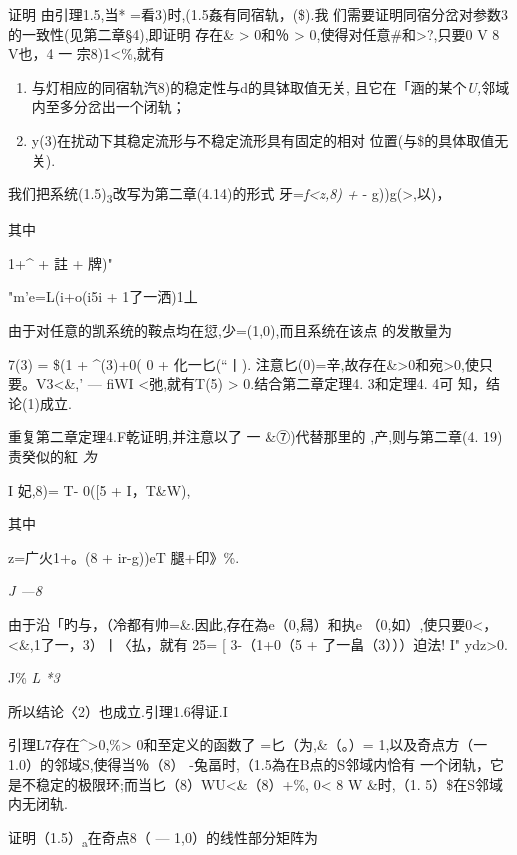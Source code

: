 \documentclass{article}
\begin{document}
证明 由引理1.5,当* =看3)时,(1.5姦有同宿轨，(\$).我
们需要证明同宿分岔对参数3的一致性(见第二章§4),即证明 存在\&
\textgreater{} 0和％ \textgreater{}
0,使得对任意\#和\textgreater{}?,只要0 V 8 V也，\textbar{}4 一
宗8)1\textless{}\%,就有

\begin{enumerate}
\def\labelenumi{(\arabic{enumi})}
\item
  与灯相应的同宿轨汽8)的稳定性与d的具钵取值无关,
  且它在「涵的某个\emph{U,}邻域内至多分岔出一个闭轨；
\item
  y(3)在扰动下其稳定流形与不稳定流形具有固定的相对
  位置(与\$的具体取值无关).
\end{enumerate}

我们把系统(1.5)\textsubscript{3}改写为第二章(4.14)的形式
牙=\emph{f\textless{}z,8) +} - g))g(\textgreater{},以)，

其中

1+\^{} + 註 + 牌)"

"m'e=L(i+o(i5i + 1了一洒)1丄

由于对任意的凯系统的鞍点均在愆,少=(1,0),而且系统在该点 的发散量为

7(3) = \$(1 + \^{}(3)+0( 0\textbar{} + 化一匕(``丨).
注意匕(0)=辛,故存在\&\textgreater{}0和宛\textgreater{}0,使只要。V3\textless{}\&,\textbar{}'
--- fiWI \textless{}弛,就有T(5) \textgreater{} 0.结合第二章定理4.
3和定理4. 4可 知，结论(1)成立.

重复第二章定理4.F乾证明,并注意以了 一 \&⑦)代替那里的 ,产,则与第二章(4.
19)责癸似的紅 \emph{为}

I 妃,8)= T- 0({[}5\textbar{} + I，T\&W),

其中

z=广火1+。(\textbar{}8\textbar{} + ir-g)\textbar{})eT 腿+印》\%.

\emph{J ---8}

由于沿「旳与，（冷都有帅=\&.因此,存在為e（0,舄）和执e
（0,如）,使只要0\textless{}，\textless{}\&,1了一，3）丨〈払，就有 25=
{[} 3-（1+0（\textbar{}5\textbar{} +
\textbar{}了一畠（3）\textbar{}））迫法! I" ydz\textgreater{}0.

J\% \emph{L *3}

所以结论〈2）也成立.引理1.6得证.I

引理L7存在\^{}\textgreater{}0,\%\textgreater{} 0和至定义的函数了
=匕（为,\&（。）= 1,以及奇点方（一 1.0）的邻域S,使得当％（8）
-兔畐时,（1.5為在B点的S邻域内恰有
一个闭轨，它是不稳定的极限环;而当匕（8）WU\textless{}\&（8）+\%,
0\textless{} 8 W \&时,（1. 5）\$在S邻域内无闭轨.

证明（1.5）\textsubscript{a}在奇点8（ --- 1,0）的线性部分矩阵为
\end{document}
